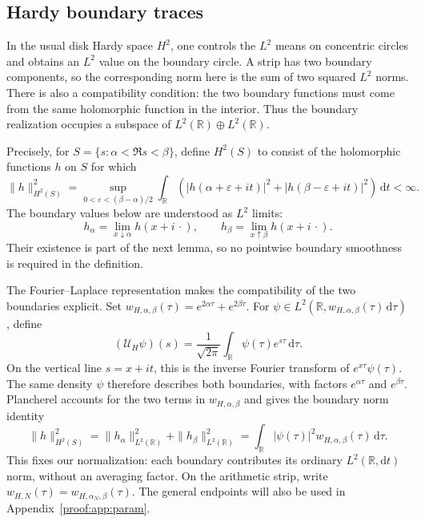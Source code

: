 \documentclass[12pt,a4paper]{amsart}
\numberwithin{equation}{section}
\theoremstyle{plain}
\theoremstyle{definition}
\theoremstyle{remark}
\begin{document}
\subsection{Hardy boundary traces}

In the usual disk Hardy space $H^2$, one controls the $L^2$
means on concentric circles and obtains an $L^2$ value on the
boundary circle. A strip has two boundary components, so the
corresponding norm here is the sum of two squared $L^2$ norms.
There is also a compatibility condition: the two boundary
functions must come from the same holomorphic function in the
interior. Thus the boundary realization occupies a subspace of
$L^2(\mathbb R)\oplus L^2(\mathbb R)$.

Precisely, for $S=\{s:\alpha<\Re s<\beta\}$, define $H^2(S)$
to consist of the holomorphic functions $h$ on $S$ for which
\begin{equation}\label{hd:interior-norm}
 \|h\|_{H^2(S)}^2
 =\sup_{0<\varepsilon<(\beta-\alpha)/2}
 \int_{\mathbb R}\left(
 |h(\alpha+\varepsilon+it)|^2+
 |h(\beta-\varepsilon+it)|^2\right)\,\mathrm{d}t<\infty.
\end{equation}
The boundary values below are understood as $L^2$ limits:
\[
 h_\alpha=\lim_{x\downarrow\alpha}h(x+i\,\cdot),\qquad
 h_\beta=\lim_{x\uparrow\beta}h(x+i\,\cdot).
\]
Their existence is part of the next lemma, so no pointwise
boundary smoothness is required in the definition.

The Fourier--Laplace representation makes the compatibility of
the two boundaries explicit. Set
$w_{H,\alpha,\beta}(\tau)=e^{2\alpha\tau}+e^{2\beta\tau}$.
For $\psi\in L^2(\mathbb R,w_{H,\alpha,\beta}(\tau)\,\mathrm{d}\tau)$,
define
\begin{equation}\label{hd:PW-map}
 (\mathcal U_H\psi)(s)=\frac1{\sqrt{2\pi}}
       \int_{\mathbb R}\psi(\tau)e^{s\tau}\,\mathrm{d}\tau.
\end{equation}
On the vertical line $s=x+it$, this is the inverse Fourier
transform of $e^{x\tau}\psi(\tau)$. The same density $\psi$
therefore describes both boundaries, with factors $e^{\alpha\tau}$
and $e^{\beta\tau}$. Plancherel accounts for the two terms in
$w_{H,\alpha,\beta}$ and gives the boundary norm identity
\begin{equation}\label{hd:boundary-norm}
 \|h\|_{H^2(S)}^2
 =\|h_\alpha\|_{L^2(\mathbb R)}^2
   +\|h_\beta\|_{L^2(\mathbb R)}^2
 =\int_{\mathbb R}|\psi(\tau)|^2
                     w_{H,\alpha,\beta}(\tau)\,\mathrm{d}\tau.
\end{equation}
This fixes our normalization: each boundary contributes its
ordinary $L^2(\mathbb R,\mathrm{d}t)$ norm, without an averaging factor.
On the arithmetic strip, write
$w_{H,N}(\tau)=w_{H,\alpha_N,\beta}(\tau)$.
The general endpoints will also be used in Appendix~\ref{proof:app:param}.
\end{document}
